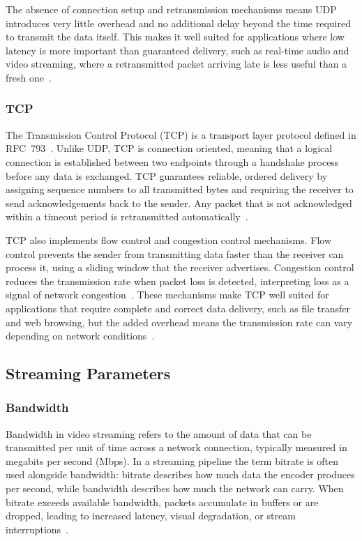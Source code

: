 The absence of connection setup and retransmission mechanisms means UDP introduces very little overhead and no additional delay beyond the time required to transmit the data itself. This makes it well suited for applications where low latency is more important than guaranteed delivery, such as real-time audio and video streaming, where a retransmitted packet arriving late is less useful than a fresh one~\cite{forouzan2012}.

\subsubsection{TCP}\label{subsubsec:tcp}
The Transmission Control Protocol (TCP) is a transport layer protocol defined in RFC~793~\cite{rfc793}. Unlike UDP, TCP is connection oriented, meaning that a logical connection is established between two endpoints through a handshake process before any data is exchanged. TCP guarantees reliable, ordered delivery by assigning sequence numbers to all transmitted bytes and requiring the receiver to send acknowledgements back to the sender. Any packet that is not acknowledged within a timeout period is retransmitted automatically~\cite{rfc793}.
 
TCP also implements flow control and congestion control mechanisms. Flow control prevents the sender from transmitting data faster than the receiver can process it, using a sliding window that the receiver advertises. Congestion control reduces the transmission rate when packet loss is detected, interpreting loss as a signal of network congestion~\cite{forouzan2012}. These mechanisms make TCP well suited for applications that require complete and correct data delivery, such as file transfer and web browsing, but the added overhead means the transmission rate can vary depending on network conditions~\cite{forouzan2012}.

\subsection{Streaming Parameters}\label{subsec:streaming-params}
 
\subsubsection{Bandwidth}\label{subsubsec:bandwidth}
Bandwidth in video streaming refers to the amount of data that can be transmitted per unit of time across a network connection, typically measured in megabits per second (Mbps). In a streaming pipeline the term bitrate is often used alongside bandwidth: bitrate describes how much data the encoder produces per second, while bandwidth describes how much the network can carry. When bitrate exceeds available bandwidth, packets accumulate in buffers or are dropped, leading to increased latency, visual degradation, or stream interruptions~\cite{sodagar2011}.
 
